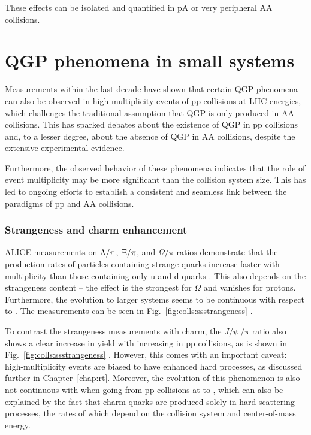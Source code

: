 These effects can be isolated and quantified in pA or very peripheral AA collisions.

\section{QGP phenomena in small systems}\label{sec:colls:qgpss}

Measurements within the last decade have shown that certain QGP phenomena can also be observed in high-multiplicity events of pp collisions at LHC energies, which challenges the traditional assumption that QGP is only produced in AA collisions. This has sparked debates about the existence of QGP in pp collisions and, to a lesser degree, about the absence of QGP in AA collisions, despite the extensive experimental evidence.

Furthermore, the observed behavior of these phenomena indicates that the role of event multiplicity \Nch may be more significant than the collision system size. This has led to ongoing efforts to establish a consistent and seamless link between the paradigms of pp and AA collisions.

\subsubsection*{Strangeness and charm enhancement}

ALICE measurements on $\Lambda/\pi$, $\Xi/\pi$, and $\Omega/\pi$ ratios demonstrate that the production rates of particles containing strange quarks increase faster with multiplicity than those containing only u and d quarks \cite{adamEnhancedProductionMultistrange2017}. This also depends on the strangeness content -- the effect is the strongest for $\Omega$ and vanishes for protons. Furthermore, the evolution to larger systems seems to be continuous with respect to \Nch. The measurements can be seen in Fig.~\ref{fig:colls:ssstrangeness} \cite{alicecollaborationALICEExperimentJourney2022}.

To contrast the strangeness measurements with charm, the $J/\psi \ /\pi$ ratio also shows a clear increase in yield with increasing \Nch in pp collisions, as is shown in Fig.~\ref{fig:colls:ssstrangeness} \cite{alicecollaborationMultiplicityDependencePsi2020, alicecollaborationObservationMultiplicityDependence2022}. However, this comes with an important caveat: high-multiplicity events are biased to have enhanced hard processes, as discussed further in Chapter~\ref{chap:rt}. Moreover, the evolution of this phenomenon is also not continuous with \Nch when going from pp collisions at  to , which can also be explained by the fact that charm quarks are produced solely in hard scattering processes, the rates of which depend on the collision system and center-of-mass energy.

